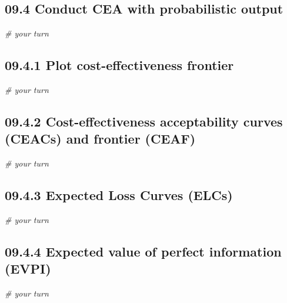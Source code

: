 \documentclass[
]{article}
\newenvironment{Shaded}{\begin{snugshade}}{\end{snugshade}}
\newcommand{\CommentTok}[1]{\textcolor[rgb]{0.56,0.35,0.01}{\textit{#1}}}
\begin{document}
\hypertarget{conduct-cea-with-probabilistic-output}{%
\subsection{09.4 Conduct CEA with probabilistic
output}\label{conduct-cea-with-probabilistic-output}}

\begin{Shaded}
\begin{Highlighting}[]
\CommentTok{# your turn}
\end{Highlighting}
\end{Shaded}

\hypertarget{plot-cost-effectiveness-frontier}{%
\subsection{09.4.1 Plot cost-effectiveness
frontier}\label{plot-cost-effectiveness-frontier}}

\begin{Shaded}
\begin{Highlighting}[]
\CommentTok{# your turn}
\end{Highlighting}
\end{Shaded}

\hypertarget{cost-effectiveness-acceptability-curves-ceacs-and-frontier-ceaf}{%
\subsection{09.4.2 Cost-effectiveness acceptability curves (CEACs) and
frontier
(CEAF)}\label{cost-effectiveness-acceptability-curves-ceacs-and-frontier-ceaf}}

\begin{Shaded}
\begin{Highlighting}[]
\CommentTok{# your turn}
\end{Highlighting}
\end{Shaded}

\hypertarget{expected-loss-curves-elcs}{%
\subsection{09.4.3 Expected Loss Curves
(ELCs)}\label{expected-loss-curves-elcs}}

\begin{Shaded}
\begin{Highlighting}[]
\CommentTok{# your turn}
\end{Highlighting}
\end{Shaded}

\hypertarget{expected-value-of-perfect-information-evpi}{%
\subsection{09.4.4 Expected value of perfect information
(EVPI)}\label{expected-value-of-perfect-information-evpi}}

\begin{Shaded}
\begin{Highlighting}[]
\CommentTok{# your turn}
\end{Highlighting}
\end{Shaded}
\end{document}

